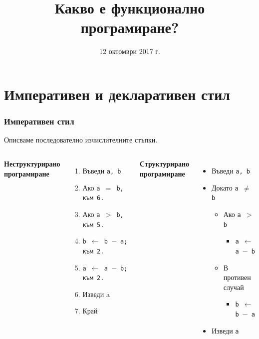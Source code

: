 \documentclass{beamer}
\title[Какво е ФП?]{Какво е функционално програмиране?}
\date{12 октомври 2017 г.}
\begin{document}
\begin{frame}
  \titlepage
\end{frame}

\section*{Императивен и декларативен стил}

\begin{frame}
  \frametitle{Императивен стил}

  Описваме последователно изчислителните стъпки.\\[1em]
  \begin{columns}[t,onlytextwidth]

    \textbf{Неструктурирано\\програмиране}\\[1em]
    \begin{enumerate}
    \item Въведи \tt a, \tt b
    \item Ако \tt{a $=$ b}, към 6.
    \item Ако \tt{a $>$ b}, към 5.
    \item \tt{b $\leftarrow$ b $-$ a}; към 2.
    \item \tt{a $\leftarrow$ a $-$ b}; към 2.
    \item Изведи a
    \item Край
    \end{enumerate}

    \textbf{Структурирано\\програмиране}\\[1em]
    \begin{itemize}
    \item Въведи \tt a, \tt b
    \item Докато \tt{a $\neq$ b}
      \begin{itemize}
      \item Ако \tt{a $>$ b}
        \begin{itemize}
        \item \tt{a $\leftarrow$ a $-$ b}
        \end{itemize}
      \item В противен случай
        \begin{itemize}
        \item \tt{b $\leftarrow$ b $-$ a}
        \end{itemize}
      \end{itemize}
    \item Изведи \tt a
    \end{itemize}

  \end{columns}
\end{frame}
\end{document}

